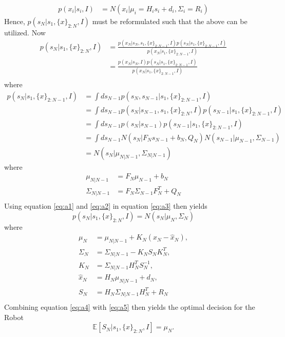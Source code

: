 \begin{example}
\begin{equation}
\begin{split}
			p(x_i|s_{i},I) &= N(x_i|\mu_i = H_is_{i}+d_i,\Sigma_i = R_i)
		\end{split}
		\label{eq:a2}
	\end{equation}
	Hence, $p(s_N|s_1,\{x\}_{2:N},I)$ must be reformulated such that the above can be utilized. 
	Now
	\begin{equation}
		\begin{split}
			p(s_N|s_1,\{x\}_{2:N},I) &= \frac{p(x_{N}|s_N,s_1,\{x\}_{2:N-1},I)p(s_N|s_1,\{x\}_{2:N-1},I)}{p(x_{N}|s_1,\{x\}_{2:N-1},I)}\\
			&= \frac{p(x_{N}|s_N,I)p(s_N|s_1,\{x\}_{2:N-1},I)}{p(x_{N}|s_1,\{x\}_{2:N-1},I)}\\
		\end{split}
		\label{eq:a3}
	\end{equation}
	where
	\begin{equation}
		\begin{split}
			p(s_N|s_1,\{x\}_{2:N-1},I) &= \int ds_{N-1}p(s_N,s_{N-1}|s_1,\{x\}_{2:N-1},I)\\
			&= \int ds_{N-1}p(s_N|s_{N-1},s_1,\{x\}_{2:N},I)p(s_{N-1}|s_1,\{x\}_{2:N-1},I)\\
			&= \int ds_{N-1}p(s_N|s_{N-1})p(s_{N-1}|s_1,\{x\}_{2:N-1},I)\\
			&= \int ds_{N-1} N(s_{N}|F_{N}s_{N-1}+b_{N},Q_{N})N(s_{N-1}|\mu_{N-1},\Sigma_{N-1})\\
			&=N(s_{N}|\mu_{N|N-1},\Sigma_{N|N-1})
		\end{split}
		\label{eq:a1}
	\end{equation}
	where 
	\begin{equation}
		\begin{split}
			\mu_{N|N-1} &= F_{N}\mu_{N-1}+b_N\\
			\Sigma_{N|N-1} &= F_{N}\Sigma_{N-1}F_{N}^T+Q_{N}\\
		\end{split}
	\end{equation}
	Using equation \eqref{eq:a1} and \eqref{eq:a2} in equation \eqref{eq:a3} then yields~\citep{murphy2023probabilistic}
	\begin{equation}
		p(s_N|s_1,\{x\}_{2:N},I) = N(s_N|\mu_{N},\Sigma_N)
		\label{eq:a4}
	\end{equation}
	where
	\begin{equation}
		\begin{split}
			\mu_{N} &= \mu_{N|N-1}+K_N(x_N-\hat{x}_N),\\
			\Sigma_{N} &= \Sigma_{N|N-1}-K_NS_NK_N^T,\\
			K_N & = \Sigma_{N|N-1}H_N^TS_N^{-1},\\
			\hat{x}_N&= H_N\mu_{N|N-1}+d_N,\\
			S_N & = H_N\Sigma_{N|N-1}H_N^T+R_N\\
		\end{split}
	\end{equation}
	Combining equation \eqref{eq:a4} with \eqref{eq:a5} then yields the optimal decision for the Robot
	\begin{equation}
		\mathbb{E}[S_{N}|s_1,\{x\}_{2:N},I] = \mu_{N}.
	\end{equation}
	
\end{example}

